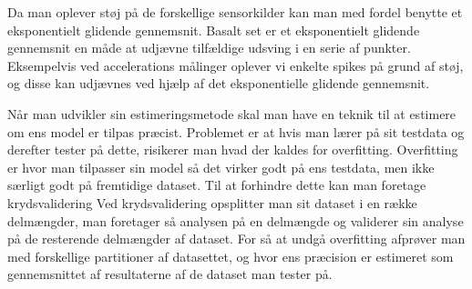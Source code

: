 \begin{description}[style=nextline]
\item[Eksponentielt glidende gennemsnit]
Da man oplever støj på de forskellige sensorkilder kan man med fordel benytte et eksponentielt glidende gennemsnit.
Basalt set er et eksponentielt glidende gennemsnit en måde at udjævne tilfældige udsving i en serie af punkter.
Eksempelvis ved accelerations målinger oplever vi enkelte spikes på grund af støj, og disse kan udjævnes ved hjælp af det eksponentielle glidende gennemsnit.

\item[Krydsvalidering]
Når man udvikler sin estimeringsmetode skal man have en teknik til at estimere om ens model er tilpas præcist.
Problemet er at hvis man lærer på sit testdata og derefter tester på dette, risikerer man hvad der kaldes for overfitting.
Overfitting er hvor man tilpasser sin model så det virker godt på ens testdata, men ikke særligt godt på fremtidige dataset.
Til at forhindre dette kan man foretage krydsvalidering
Ved krydsvalidering opsplitter man sit dataset i en række delmængder, man foretager så analysen på en delmængde og validerer sin analyse på de resterende delmængder af dataset.
For så at undgå overfitting afprøver man med forskellige partitioner af datasettet, og hvor ens præcision er estimeret som gennemsnittet af resultaterne af de dataset man tester på.

\end{description}